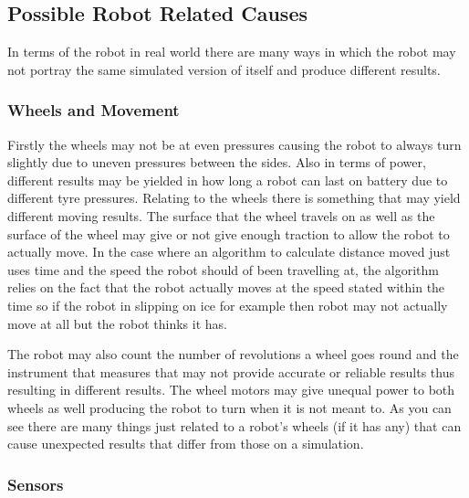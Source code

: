 \documentclass[a4paper,12pt]{article}
\begin{document}
\subsection{Possible Robot Related Causes}

\noindent In terms of the robot in real world there are many ways in which the robot may not portray the same simulated version of itself and produce different results.

\subsubsection{Wheels and Movement}
Firstly the wheels may not be at even pressures causing the robot to always turn slightly due to uneven pressures between the sides. Also in terms of power, different results may be yielded in how long a robot can last on battery due to different tyre pressures. Relating to the wheels there is something that may yield different moving results. The surface that the wheel travels on as well as the surface of the wheel may give or not give enough traction to allow the robot to actually move. In the case where an algorithm to calculate distance moved just uses time and the speed the robot should of been travelling at, the algorithm relies on the fact that the robot actually moves at the speed stated within the time so if the robot in slipping on ice for example then robot may not actually move at all but the robot thinks it has.

\vspace{5mm}
\noindent The robot may also count the number of revolutions a wheel goes round and the instrument that measures that may not provide accurate or reliable results thus resulting in different results. The wheel motors may give unequal power to both wheels as well producing the robot to turn when it is not meant to. As you can see there are many things just related to a robot's wheels (if it has any) that can cause unexpected results that differ from those on a simulation.

\subsubsection{Sensors}
\end{document}
